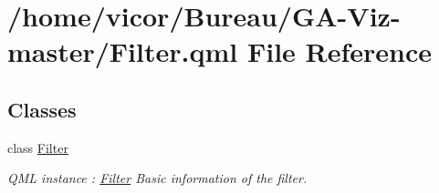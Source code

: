 \hypertarget{_filter_8qml}{}\section{/home/vicor/\+Bureau/\+G\+A-\/\+Viz-\/master/\+Filter.qml File Reference}
\label{_filter_8qml}
\subsection*{Classes}
\begin{DoxyCompactItemize}
\item 
class \hyperlink{class_filter}{Filter}
\begin{DoxyCompactList}\small\item\em Q\+ML instance \+: \hyperlink{class_filter}{Filter} Basic information of the filter. \end{DoxyCompactList}\end{DoxyCompactItemize}
